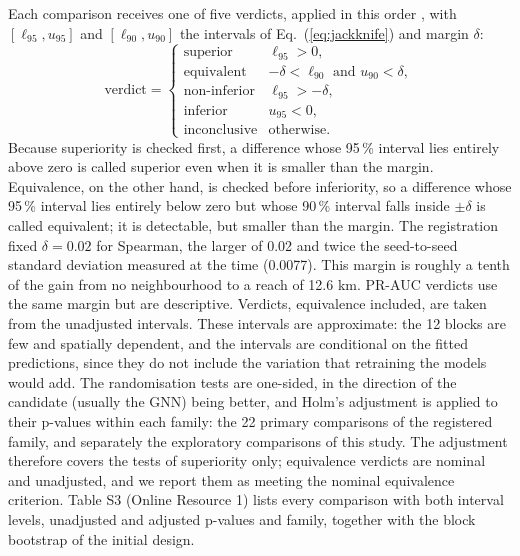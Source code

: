 \documentclass[pdflatex,sn-basic]{sn-jnl}
\begin{document}
Each comparison receives one of five verdicts, applied in this order \citep[two one-sided tests for equivalence;][]{lakens2017}, with $[\ell_{95}, u_{95}]$ and $[\ell_{90}, u_{90}]$ the intervals of Eq.~(\ref{eq:jackknife}) and margin $\delta$:
\begin{equation}
\text{verdict} = \begin{cases} \text{superior} & \ell_{95} > 0,\\ \text{equivalent} & -\delta < \ell_{90} \text{ and } u_{90} < \delta,\\ \text{non-inferior} & \ell_{95} > -\delta,\\ \text{inferior} & u_{95} < 0,\\ \text{inconclusive} & \text{otherwise.} \end{cases} \label{eq:verdict}
\end{equation}
Because superiority is checked first, a difference whose 95\,\% interval lies entirely above zero is called superior even when it is smaller than the margin. Equivalence, on the other hand, is checked before inferiority, so a difference whose 95\,\% interval lies entirely below zero but whose 90\,\% interval falls inside $\pm\delta$ is called equivalent; it is detectable, but smaller than the margin. The registration fixed $\delta = 0.02$ for Spearman, the larger of 0.02 and twice the seed-to-seed standard deviation measured at the time (0.0077). This margin is roughly a tenth of the gain from no neighbourhood to a reach of 12.6 km. PR-AUC verdicts use the same margin but are descriptive. Verdicts, equivalence included, are taken from the unadjusted intervals. These intervals are approximate: the 12 blocks are few and spatially dependent, and the intervals are conditional on the fitted predictions, since they do not include the variation that retraining the models would add. The randomisation tests are one-sided, in the direction of the candidate (usually the GNN) being better, and Holm's adjustment \citep{holm1979} is applied to their p-values within each family: the 22 primary comparisons of the registered family, and separately the exploratory comparisons of this study. The adjustment therefore covers the tests of superiority only; equivalence verdicts are nominal and unadjusted, and we report them as meeting the nominal equivalence criterion. Table S3 (Online Resource 1) lists every comparison with both interval levels, unadjusted and adjusted p-values and family, together with the block bootstrap of the initial design.
\end{document}
